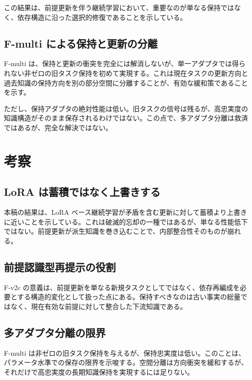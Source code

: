 \documentclass[12pt,a4paper]{article}
\begin{document}
この結果は、前提更新を伴う継続学習において、重要なのが単なる保持ではなく、依存構造に沿った選択的修復であることを示している。

\subsection{F-multi による保持と更新の分離}

F-multi は、保持と更新の衝突を完全には解消しないが、単一アダプタでは得られない非ゼロの旧タスク保持を初めて実現する。これは現在タスクの更新方向と過去知識の保持方向を別の部分空間に分離することが、有効な緩和策であることを示す。

ただし、保持アダプタの絶対性能は低い。旧タスクの信号は残るが、高忠実度の知識構造がそのまま保存されるわけではない。この点で、多アダプタ分離は救済ではあるが、完全な解決ではない。

\section{考察}

\subsection{LoRA は蓄積ではなく上書きする}

本稿の結果は、LoRA ベース継続学習が矛盾を含む更新に対して蓄積より上書きに近いことを示している。これは破滅的忘却の一種ではあるが、単なる性能低下ではない。前提更新が派生知識を巻き込むことで、内部整合性そのものが崩れる。

\subsection{前提認識型再提示の役割}

F-v2c の意義は、前提更新を単なる新規タスクとしてではなく、依存再編成を必要とする構造的変化として扱った点にある。保持すべきなのは古い事実の総量ではなく、現在有効な前提に対して整合した下流知識である。

\subsection{多アダプタ分離の限界}

F-multi は非ゼロの旧タスク保持を与えるが、保持忠実度は低い。このことは、パラメータ水準での保存の限界を示唆する。空間分離は方向衝突を緩和するが、それだけで高忠実度の長期知識保持を実現するには足りない。
\end{document}
